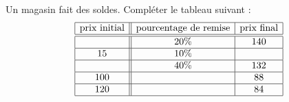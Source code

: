 
\begin{exercice}\label{exosmath-0033}

    Un magasin fait des soldes. Compléter le tableau suivant :
    \begin{equation*}
        \begin{array}[]{|c||c|c|}
            \hline
            \text{prix initial}&\text{pourcentage de remise}&\text{prix final}\\
            \hline\hline
            &20\%&140\\
            \hline
            15&10\%&\\
            \hline
            &40\%&132\\
            \hline
            100&&88\\
            \hline
            120&&84\\
            \hline
        \end{array}
    \end{equation*}

\end{exercice}
